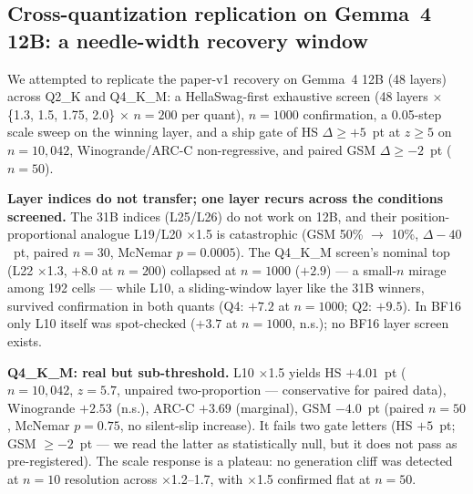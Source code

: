 \documentclass[11pt]{article}
\begin{document}
\subsection{Cross-quantization replication on Gemma~4 12B: a needle-width recovery window}
\label{ssec:12b-replication}

We attempted to replicate the paper-v1 recovery on Gemma~4 12B (48 layers)
across Q2\_K and Q4\_K\_M: a HellaSwag-first exhaustive screen
(48 layers $\times$ \{1.3, 1.5, 1.75, 2.0\} $\times$ $n{=}200$ per quant),
$n{=}1000$ confirmation, a 0.05-step scale sweep on the winning layer, and
a ship gate of HS $\Delta \geq +5$~pt at $z \geq 5$ on $n{=}10{,}042$,
Winogrande/ARC-C non-regressive, and paired GSM $\Delta \geq -2$~pt
($n{=}50$).

\textbf{Layer indices do not transfer; one layer recurs across the
conditions screened.} The 31B indices (L25/L26) do not work on 12B, and
their position-proportional analogue L19/L20 $\times$1.5 is catastrophic
(GSM 50\% $\to$ 10\%, $\Delta{-}40$~pt, paired $n{=}30$, McNemar
$p{=}0.0005$). The Q4\_K\_M screen's nominal top (L22 $\times$1.3, $+8.0$
at $n{=}200$) collapsed at $n{=}1000$ ($+2.9$) --- a small-$n$ mirage
among 192 cells --- while L10, a sliding-window layer like the 31B
winners, survived confirmation in both quants (Q4: $+7.2$ at $n{=}1000$;
Q2: $+9.5$). In BF16 only L10 itself was spot-checked ($+3.7$ at
$n{=}1000$, n.s.); no BF16 layer screen exists.

\textbf{Q4\_K\_M: real but sub-threshold.} L10 $\times$1.5 yields HS
$+4.01$~pt ($n{=}10{,}042$, $z{=}5.7$, unpaired two-proportion ---
conservative for paired data), Winogrande $+2.53$ (n.s.), ARC-C $+3.69$
(marginal), GSM $-4.0$~pt (paired $n{=}50$, McNemar $p{=}0.75$, no
silent-slip increase). It fails two gate letters (HS $+5$~pt; GSM
$\geq -2$~pt --- we read the latter as statistically null, but it does
not pass as pre-registered). The scale response is a plateau: no
generation cliff was detected at $n{=}10$ resolution across
$\times$1.2--1.7, with $\times$1.5 confirmed flat at $n{=}50$.
\end{document}
